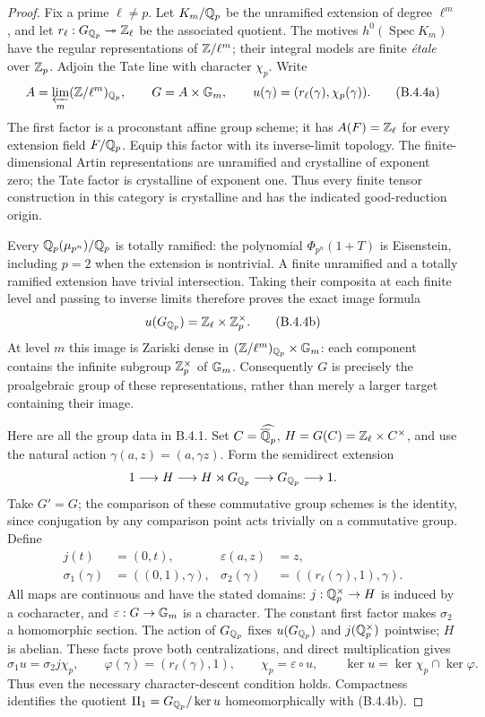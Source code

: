 \begin{proof}
Fix a prime $\ell\ne p$. Let $K_m/\mathbb Q_p$ be the unramified
extension of degree $\ell^m$, and let
$r_\ell:G_{\mathbb Q_p}\twoheadrightarrow\mathbb Z_\ell$ be the associated
quotient. The motives $h^0(\operatorname{Spec}K_m)$ have the
regular representations of $\mathbb Z/\ell^m$; their integral models
are finite \emph{\'etale} over $\mathbb Z_p$. Adjoin the Tate line
with character $\chi_p$. Write
\[
 A=\varprojlim_m(\mathbb Z/\ell^m)_{\mathbb Q_p},\qquad
 G=A\times\mathbb G_m,\qquad
 u(\gamma)=(r_\ell(\gamma),\chi_p(\gamma)).
 \tag{B.4.4a}
\]
The first factor is a proconstant affine group scheme; it has
$A(F)=\mathbb Z_\ell$ for every extension field $F/\mathbb Q_p$. Equip this
factor with its inverse-limit topology. The finite-dimensional
Artin representations are unramified and crystalline of
exponent zero; the Tate factor is crystalline of exponent one.
Thus every finite tensor construction in this category is
crystalline and has the indicated good-reduction origin.

Every $\mathbb Q_p(\mu_{p^n})/\mathbb Q_p$ is totally ramified: the
polynomial $\Phi_{p^n}(1+T)$ is Eisenstein, including $p=2$
when the extension is nontrivial. A finite unramified and a
totally ramified extension have trivial intersection. Taking
their composita at each finite level and passing to inverse
limits therefore proves the exact image formula
\[
                  u(G_{\mathbb Q_p})=\mathbb Z_\ell\times\mathbb Z_p^\times.
 \tag{B.4.4b}
\]
At level $m$ this image is Zariski dense in
$(\mathbb Z/\ell^m)_{\mathbb Q_p}\times\mathbb G_m$: each component contains the
infinite subgroup $\mathbb Z_p^\times$ of $\mathbb G_m$. Consequently $G$
is precisely the proalgebraic group of these representations,
rather than merely a larger target containing their image.

Here are all the group data in B.4.1. Set $C=\widehat{\overline{\mathbb Q}_p}$,
$H=G(C)=\mathbb Z_\ell\times C^\times$, and use the natural action
$\gamma(a,z)=(a,\gamma z)$. Form the semidirect extension
\[
 1\longrightarrow H\longrightarrow H\rtimes G_{\mathbb Q_p}
                  \longrightarrow G_{\mathbb Q_p}\longrightarrow1.
\]
Take $G'=G$; the comparison of these commutative group schemes
is the identity, since conjugation by any comparison point
acts trivially on a commutative group. Define
\[
\begin{aligned}
 j(t)&=(0,t),&\varepsilon(a,z)&=z,\\
 \sigma_1(\gamma)&=((0,1),\gamma),&
 \sigma_2(\gamma)&=((r_\ell(\gamma),1),\gamma).
\end{aligned}
 \tag{B.4.4c}
\]
All maps are continuous and have the stated domains:
$j:\mathbb Q_p^\times\to H$ is induced by a cocharacter, and
$\varepsilon:G\to\mathbb G_m$ is a character. The constant first
factor makes $\sigma_2$ a homomorphic section. The action of
$G_{\mathbb Q_p}$ fixes $u(G_{\mathbb Q_p})$ and $j(\mathbb Q_p^\times)$ pointwise;
$H$ is abelian. These facts prove both centralizations, and
direct multiplication gives
\[
 \sigma_1u=\sigma_2j\chi_p,\qquad
 \varphi(\gamma)=(r_\ell(\gamma),1),\qquad
 \chi_p=\varepsilon\circ u,\qquad
 \ker u=\ker\chi_p\cap\ker\varphi.
\]
Thus even the necessary character-descent condition holds.
Compactness identifies the quotient $\Pi_1=G_{\mathbb Q_p}/\ker u$
homeomorphically with (B.4.4b).


\end{proof}
